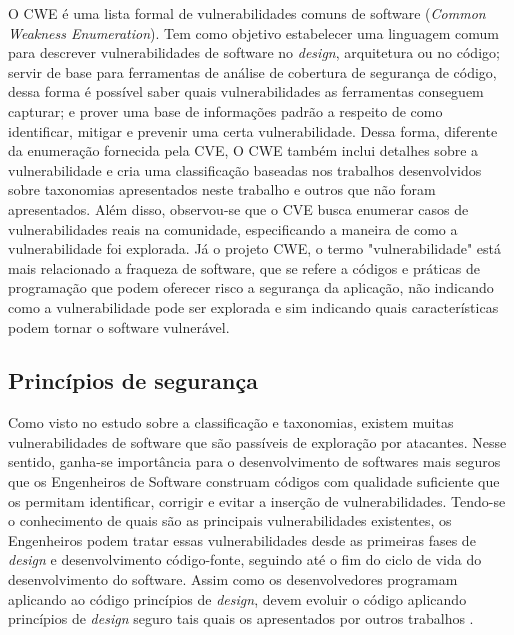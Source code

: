 %

O CWE é uma lista formal de vulnerabilidades comuns de software (\emph{Common Weakness Enumeration}). Tem como objetivo estabelecer uma linguagem comum para descrever vulnerabilidades de software no \emph{design}, arquitetura ou no código; servir de base para ferramentas de análise de cobertura de segurança de código, dessa forma é possível saber quais vulnerabilidades as ferramentas conseguem capturar; e prover uma base de informações padrão a respeito de como identificar, mitigar e prevenir uma certa vulnerabilidade. Dessa forma, diferente da enumeração fornecida pela CVE, O CWE também inclui detalhes sobre a vulnerabilidade e cria uma classificação baseadas nos trabalhos desenvolvidos sobre taxonomias apresentados neste trabalho e outros que não foram apresentados. Além disso, observou-se que o CVE busca enumerar casos de vulnerabilidades reais na comunidade, especificando a maneira de como a vulnerabilidade foi explorada. Já o projeto CWE, o termo "vulnerabilidade" está mais relacionado a fraqueza de software, que se refere a códigos e práticas de programação que podem oferecer risco a segurança da aplicação, não indicando como a vulnerabilidade pode ser explorada e sim indicando quais características podem tornar o software vulnerável.

%

\subsection{Princípios de segurança}
\label{sec-security-principles}

Como visto no estudo sobre a classificação e taxonomias, existem muitas vulnerabilidades de software que são passíveis de exploração por atacantes. Nesse sentido, ganha-se importância para o desenvolvimento de softwares mais seguros que os Engenheiros de Software construam códigos com qualidade suficiente que os permitam identificar, corrigir e evitar a inserção de vulnerabilidades. Tendo-se o conhecimento de quais são as principais vulnerabilidades existentes, os Engenheiros podem tratar essas vulnerabilidades desde as primeiras fases de \emph{design} e desenvolvimento código-fonte, seguindo até o fim do ciclo de vida do desenvolvimento do software. Assim como os desenvolvedores programam aplicando ao código princípios de \emph{design}, devem evoluir o código aplicando princípios de \emph{design} seguro tais quais os apresentados por outros trabalhos \cite{saltzer1975} \cite{bishop2003} \cite{mcgraw2002} \cite{a1lshammari2009}.

